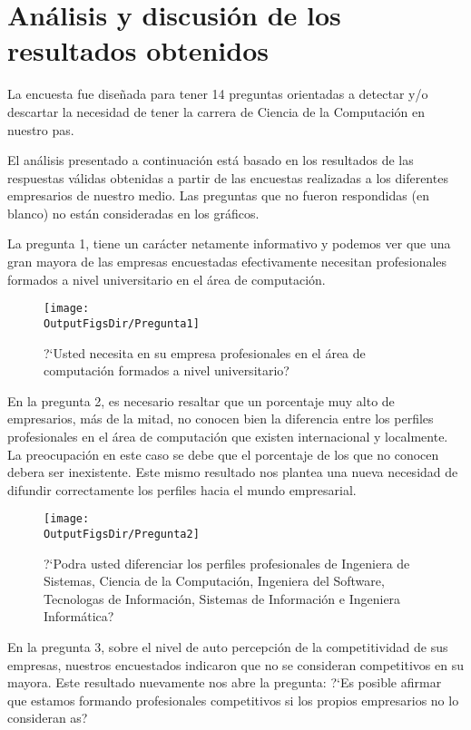 \section{Análisis y discusión de los resultados obtenidos}\label{sec:cs-resultados-de-la-encuesta}

La encuesta fue diseñada para tener 14 preguntas orientadas a detectar y/o descartar la necesidad de tener la carrera de Ciencia de la Computación en nuestro pa­s.

El análisis presentado a continuación está basado en los resultados de las respuestas válidas obtenidas a partir de las encuestas realizadas a los diferentes empresarios de nuestro medio. Las preguntas que no fueron respondidas (en blanco) no están consideradas en los gráficos.

La pregunta 1, tiene un carácter netamente informativo y podemos ver que una gran mayor­a de las empresas encuestadas efectivamente necesitan profesionales formados a nivel universitario en el área de computación.

\newcommand{\mywidth}{10cm}

\begin{figure}[!h]
	\centering
	\texttt{[image: \\OutputFigsDir/Pregunta1]}
	\label{fig:Preg1}
	\caption{?`Usted necesita en su empresa profesionales en el área de computación formados a nivel universitario?}
\end{figure}


En la pregunta 2, es necesario resaltar que un porcentaje muy alto de empresarios, más de la mitad, no conocen bien la diferencia entre los perfiles profesionales en el área de computación que existen internacional y localmente. La preocupación en este caso se debe que el porcentaje de los que no conocen deber­a ser inexistente. Este mismo resultado nos plantea una nueva necesidad de difundir correctamente los perfiles hacia el mundo empresarial.


\begin{figure}[!h]
	\centering
	\texttt{[image: \\OutputFigsDir/Pregunta2]}
	\label{fig:Preg2}
	\caption{?`Podr­a usted diferenciar los perfiles profesionales de Ingenier­a de Sistemas, Ciencia de la Computación, Ingenier­a del Software, Tecnolog­as de Información, Sistemas de Información e Ingenier­a Informática?}
\end{figure}

En la pregunta 3, sobre el nivel de auto percepción de la competitividad de sus empresas, nuestros encuestados indicaron que no se consideran competitivos en su mayor­a. Este resultado nuevamente nos abre la pregunta: ?`Es posible afirmar que estamos formando profesionales competitivos si los propios empresarios no lo consideran as­?

